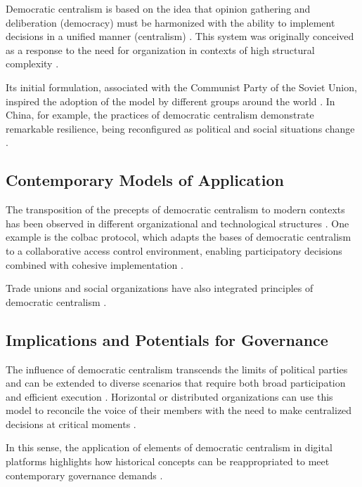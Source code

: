 Democratic centralism is based on the idea that opinion gathering and
deliberation (democracy) must be harmonized with the ability to implement
decisions in a unified manner (centralism)
\cite{ACenturyofDemocraticCentralism}. This system was originally conceived as a
response to the need for organization in contexts of high structural complexity
\cite{StillaCenturyoftheChineseModel}.

Its initial formulation, associated with the Communist Party of the Soviet
Union, inspired the adoption of the model by different groups around the world
\cite{StillaCenturyoftheChineseModel}. In China, for example, the practices of democratic
centralism demonstrate remarkable resilience, being reconfigured as political
and social situations change \cite{ACenturyofDemocraticCentralism}.

\subsection{Contemporary Models of Application}
\label{subsec:contemporary_models_application}

The transposition of the precepts of democratic centralism to modern contexts
has been observed in different organizational and technological structures
\cite{DoArtifactsHavePolitics, Colbac}. One example is the \gls{colbac}
protocol, which adapts the bases of democratic centralism to a collaborative
access control environment, enabling participatory decisions combined with
cohesive implementation \cite{Colbac}.

Trade unions and social organizations have also integrated principles of
democratic centralism \cite{CGTPStatutes}.

\subsection{Implications and Potentials for Governance}
\label{subsec:implications_potentials_governance}

The influence of democratic centralism transcends the limits of political
parties and can be extended to diverse scenarios that require both broad
participation and efficient execution \cite{ACenturyofDemocraticCentralism,
TheCostsofConnection}. Horizontal or distributed organizations can use this
model to reconcile the voice of their members with the need to make centralized
decisions at critical moments
\cite{StillaCenturyoftheChineseModel,ACenturyofDemocraticCentralism}.

In this sense, the application of elements of democratic centralism in digital
platforms highlights how historical concepts can be reappropriated to meet
contemporary governance demands \cite{Colbac}.

